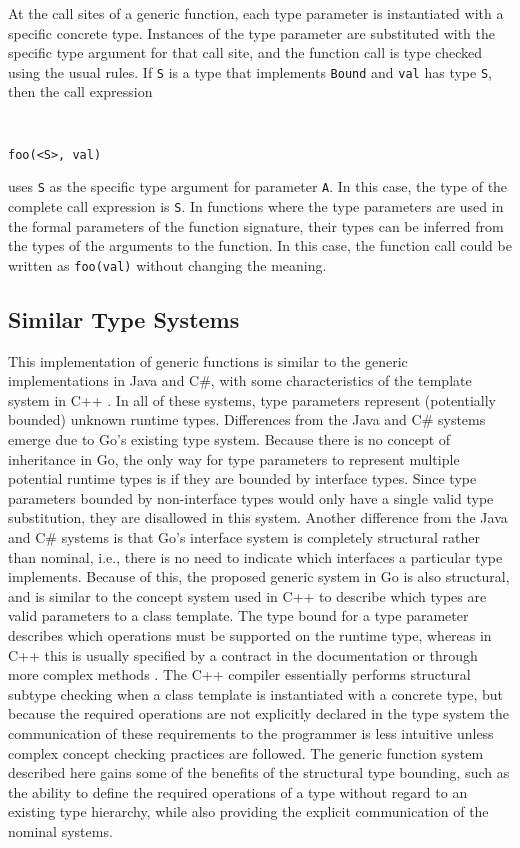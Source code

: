 \documentclass[letterpaper,11pt]{article}
\begin{document}
At the call sites of a generic function, each type parameter is instantiated with a specific concrete type. Instances of the type parameter are substituted with the specific type argument for that call site, and the function call is type checked using the usual rules. If \texttt{S} is a type that implements \texttt{Bound} and \texttt{val} has type \texttt{S}, then the call expression
{ \tt \small
\begin{verbatim}
foo(<S>, val)
\end{verbatim}
}
uses \texttt{S} as the specific type argument for parameter \texttt{A}. In this case, the type of the complete call expression is \texttt{S}. In functions where the type parameters are used in the formal parameters of the function signature, their types can be inferred from the types of the arguments to the function. In this case, the function call could be written as \texttt{foo(val)} without changing the meaning.

\subsection{Similar Type Systems} \label{similartypesystems}

This implementation of generic functions is similar to the generic implementations in Java and C\#, with some characteristics of the template system in C++ \cite{ghosh2004generics} \cite{csharp}. In all of these systems, type parameters represent (potentially bounded) unknown runtime types. Differences from the Java and C\# systems emerge due to Go's existing type system. Because there is no concept of inheritance in Go, the only way for type parameters to represent multiple potential runtime types is if they are bounded by interface types. Since type parameters bounded by non-interface types would only have a single valid type substitution, they are disallowed in this system. Another difference from the Java and C\# systems is that Go's interface system is completely structural rather than nominal, i.e., there is no need to indicate which interfaces a particular type implements. Because of this, the proposed generic system in Go is also structural, and is similar to the concept system used in C++ to describe which types are valid parameters to a class template. The type bound for a type parameter describes which operations must be supported on the runtime type, whereas in C++ this is usually specified by a contract in the documentation or through more complex methods \cite{siek2000concept}. The C++ compiler essentially performs structural subtype checking when a class template is instantiated with a concrete type, but because the required operations are not explicitly declared in the type system the communication of these requirements to the programmer is less intuitive unless complex concept checking practices are followed. The generic function system described here gains some of the benefits of the structural type bounding, such as the ability to define the required operations of a type without regard to an existing type hierarchy, while also providing the explicit communication of the nominal systems.
\end{document}
